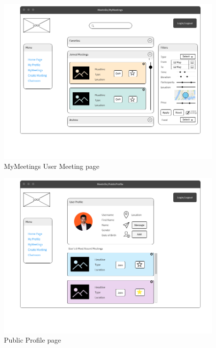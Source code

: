 \documentclass[conference]{IEEEtran}
\begin{document}
\begin{figure}
  \centering
  \includegraphics[scale=0.3]{pics/mockups/Mymeetings.png}\quad
  \caption { MyMeetings User Meeting page}
\end{figure}

\begin{figure}
  \centering
  \includegraphics[scale=0.3]{pics/mockups/PublicProfile.png}\quad
  \caption { Public Profile page}
\end{figure}
\end{document}
